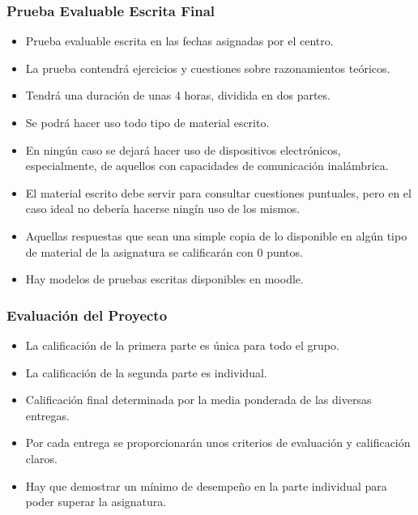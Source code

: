 \documentclass[a4paper,slidestop,xcolor=pst,dvips,blue]{beamer}
\begin{document}
\begin{frame}
	\frametitle{Prueba Evaluable Escrita Final}
	\begin{itemize}[<+->]
		\item Prueba evaluable escrita en las fechas asignadas por el centro.
		\item La prueba contendrá ejercicios y cuestiones sobre razonamientos teóricos.
		\item Tendrá una duración de unas 4 horas, dividida en dos partes.
        \item Se podrá hacer uso todo tipo de material escrito.
        \item En ningún caso se dejará hacer uso de dispositivos electrónicos, especialmente, de aquellos con capacidades de comunicación inalámbrica.
		\item \alert{El material escrito debe servir para consultar cuestiones puntuales, pero en el caso ideal no debería hacerse ningín uso de los mismos}.
		\item Aquellas respuestas que sean una simple copia de lo disponible en algún tipo de material de la asignatura se calificarán con 0 puntos.
        \item Hay modelos de pruebas escritas disponibles en moodle.
	\end{itemize}
\end{frame}

\begin{frame}[c]
	\frametitle{Evaluación del Proyecto}
	\begin{itemize}[<+->]
        \item La calificación de la primera parte es única para todo el grupo.
        \item La calificación de la segunda parte es individual.
        \item Calificación final determinada por la media ponderada de las diversas entregas.
        \item Por cada entrega se proporcionarán unos criterios de evaluación y calificación claros.
        \item Hay que demostrar un mínimo de desempeño en la parte individual para poder superar la asignatura.
	\end{itemize}
\end{frame}
\end{document}
